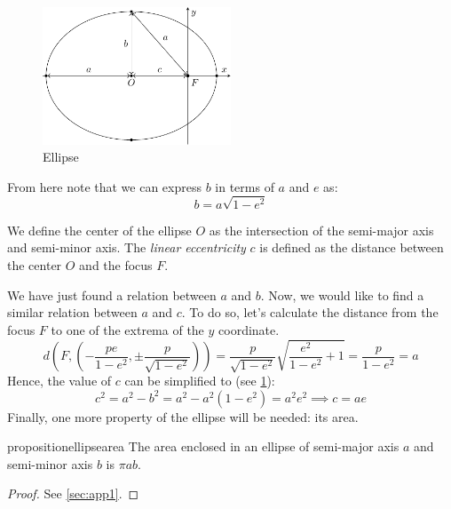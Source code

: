 \documentclass[../main.tex]{subfiles}
\begin{document}
\begin{figure}[htbp]
  \centering
  \includegraphics[width=0.5\textwidth]{Images/ellipse.pdf}
  \caption{Ellipse}
  \label{fig:ellipse}
\end{figure}

From here note that we can express $b$ in terms of $a$ and $e$ as:
\begin{equation}\label{eq:ellipse_b_a}
  b=a\sqrt{1-e^2}
\end{equation}
\begin{definition}
  We define the center of the ellipse $O$ as the intersection of the semi-major axis and semi-minor axis. The \emph{linear eccentricity} $c$ is defined as the distance between the center $O$ and the focus $F$.
\end{definition}
We have just found a relation between $a$ and $b$. Now, we would like to find a similar relation between $a$ and $c$. To do so, let's calculate the distance from the focus $F$ to one of the extrema of the $y$ coordinate.
\begin{equation}
  d\left(F,\left(-\frac{pe}{1-e^2},\pm \frac{p}{\sqrt{1-e^2}}\right)\right)=\frac{p}{\sqrt{1-e^2}}\sqrt{\frac{e^2}{1-e^2}+1}=\frac{p}{1-e^2}=a
\end{equation}
Hence, the value of $c$ can be simplified to (see \cref{fig:ellipse}):
\begin{equation}
  c^2=a^2-b^2=a^2-a^2(1-e^2)=a^2e^2\implies c=ae
\end{equation}
Finally, one more property of the ellipse will be needed: its area.
\begin{restatable}{proposition}{ellipsearea}\label{prop:ellipse_area}
  The area enclosed in an ellipse of semi-major axis $a$ and semi-minor axis $b$ is $\pi a b$.
\end{restatable}
\begin{proof}
  See \cref{sec:app1}.
\end{proof}
\end{document}
